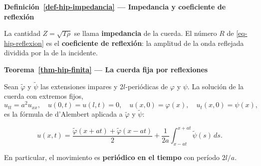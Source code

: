 \documentclass[
  spanish,
  a4paper,
]{scrbook}
\theoremstyle{definition}
\theoremstyle{plain}
\theoremstyle{definition}
\theoremstyle{plain}
\theoremstyle{definition}
\theoremstyle{remark}
\begin{document}
\begin{tcolorbox}[enhanced jigsaw, arc=.35mm, bottomrule=.15mm, breakable, colback=white, colframe=quarto-callout-note-color-frame, left=2mm, leftrule=.75mm, opacityback=0, rightrule=.15mm, toprule=.15mm]
\begin{minipage}[t]{5.5mm}
\textcolor{quarto-callout-note-color}{\faInfo}
\end{minipage}%
\begin{minipage}[t]{\textwidth - 5.5mm}

\vspace{-3mm}\textbf{Definición~\ref{def-hip-impedancia} --- Impedancia y coeficiente de
reflexión}\vspace{3mm}

La cantidad \(Z = \sqrt{T\rho}\) se llama \textbf{impedancia} de la
cuerda. El número \(R\) de \ref{eq-hip-reflexion} es el
\textbf{coeficiente de reflexión}: la amplitud de la onda reflejada
dividida por la de la incidente.

\end{minipage}%
\end{tcolorbox}

\begin{tcolorbox}[enhanced jigsaw, arc=.35mm, bottomrule=.15mm, breakable, colback=white, colframe=quarto-callout-note-color-frame, left=2mm, leftrule=.75mm, opacityback=0, rightrule=.15mm, toprule=.15mm]
\begin{minipage}[t]{5.5mm}
\textcolor{quarto-callout-note-color}{\faInfo}
\end{minipage}%
\begin{minipage}[t]{\textwidth - 5.5mm}

\vspace{-3mm}\textbf{Teorema~\ref{thm-hip-finita} --- La cuerda fija por reflexiones}\vspace{3mm}

Sean \(\tilde\varphi\) y \(\tilde\psi\) las extensiones impares y
\(2l\)-periódicas de \(\varphi\) y \(\psi\). La solución de la cuerda
con extremos fijos,
\[u_{tt} = a^2u_{xx},\quad u(0,t) = u(l,t) = 0,\quad u(x,0) = \varphi(x),\quad u_t(x,0) = \psi(x),\]
es la fórmula de d'Alembert aplicada a \(\tilde\varphi\) y
\(\tilde\psi\):

\[
u(x,t) = \frac{\tilde\varphi(x+at)+\tilde\varphi(x-at)}{2} + \frac{1}{2a}\int_{x-at}^{x+at}\tilde\psi(s)\,ds .
\]

En particular, el movimiento es \textbf{periódico en el tiempo} con
período \(2l/a\).

\end{minipage}%
\end{tcolorbox}
\end{document}
